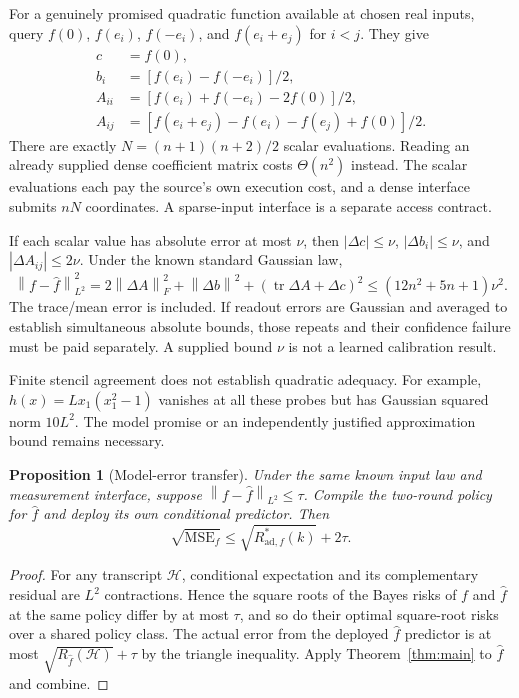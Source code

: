 \documentclass[11pt,a4paper]{article}
\newcommand{\tr}{\operatorname{tr}}\newcommand{\rank}{\operatorname{rank}}
\newcommand{\norm}[1]{\left\lVert#1\right\rVert}
\newtheorem{proposition}[theorem]{Proposition}\newtheorem{corollary}[theorem]{Corollary}
\begin{document}
For a genuinely promised quadratic function available at chosen real inputs, query $f(0)$, $f(e_i)$, $f(-e_i)$, and $f(e_i+e_j)$ for $i<j$. They give
\begin{align*}
 c&=f(0),\\
 b_i&=[f(e_i)-f(-e_i)]/2,\\
 A_{ii}&=[f(e_i)+f(-e_i)-2f(0)]/2,\\
 A_{ij}&=[f(e_i+e_j)-f(e_i)-f(e_j)+f(0)]/2.
\end{align*}
There are exactly $N=(n+1)(n+2)/2$ scalar evaluations. Reading an already supplied dense coefficient matrix costs $\Theta(n^2)$ instead. The scalar evaluations each pay the source's own execution cost, and a dense interface submits $nN$ coordinates. A sparse-input interface is a separate access contract.

If each scalar value has absolute error at most $\nu$, then $|\Delta c|\le\nu$, $|\Delta b_i|\le\nu$, and $|\Delta A_{ij}|\le2\nu$. Under the known standard Gaussian law,
\[
 \norm{f-\widehat f}_{L^2}^2
 =2\norm{\Delta A}_F^2+\norm{\Delta b}^2+
                 (\tr\Delta A+\Delta c)^2
 \le(12n^2+5n+1)\nu^2. \tag{16}
\]
The trace/mean error is included. If readout errors are Gaussian and averaged to establish simultaneous absolute bounds, those repeats and their confidence failure must be paid separately. A supplied bound $\nu$ is not a learned calibration result.

Finite stencil agreement does not establish quadratic adequacy. For example,
$h(x)=Lx_1(x_1^2-1)$ vanishes at all these probes but has Gaussian squared norm $10L^2$. The model promise or an independently justified approximation bound remains necessary.

\begin{proposition}[Model-error transfer]\label{prop:robust}
Under the same known input law and measurement interface, suppose
$\norm{f-\widehat f}_{L^2}\le\tau$. Compile the two-round policy for $\widehat f$ and deploy its own conditional predictor. Then
\[
 \boxed{\sqrt{\operatorname{MSE}_{f}}
 \le\sqrt{R^*_{\mathrm{ad},f}(k)}+2\tau.} \tag{17}
\]
\end{proposition}
\begin{proof}
For any transcript $\mathcal H$, conditional expectation and its complementary residual are $L^2$ contractions. Hence the square roots of the Bayes risks of $f$ and $\widehat f$ at the same policy differ by at most $\tau$, and so do their optimal square-root risks over a shared policy class. The actual error from the deployed $\widehat f$ predictor is at most $\sqrt{R_{\widehat f}(\mathcal H)}+\tau$ by the triangle inequality. Apply Theorem~\ref{thm:main} to $\widehat f$ and combine.
\end{proof}
\end{document}
